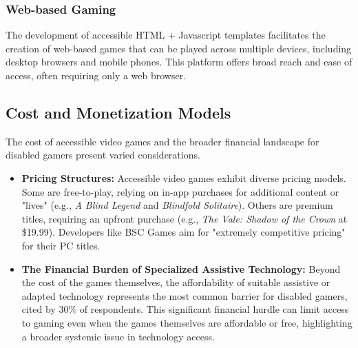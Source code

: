 \subsubsection{Web-based Gaming}

The development of accessible HTML + Javascript templates facilitates the creation of web-based games that can be played across multiple devices, including desktop browsers and mobile phones\supercite{GitHubGameEngines}. This platform offers broad reach and ease of access, often requiring only a web browser.

\subsection{Cost and Monetization Models}

The cost of accessible video games and the broader financial landscape for disabled gamers present varied considerations.
\begin{itemize}
    \item \textbf{Pricing Structures:} Accessible video games exhibit diverse pricing models. Some are free-to-play, relying on in-app purchases for additional content or "lives" (e.g., \textit{A Blind Legend}\supercite{AppleStoreBlindLegend} and \textit{Blindfold Solitaire}\supercite{AppleStoreSolitaire}). Others are premium titles, requiring an upfront purchase (e.g., \textit{The Vale: Shadow of the Crown} at \$19.99\supercite{AFBValeReview}). Developers like BSC Games aim for "extremely competitive pricing" for their PC titles\supercite{DigitalStorm2025}.
    \item \textbf{The Financial Burden of Specialized Assistive Technology:} Beyond the cost of the games themselves, the affordability of suitable assistive or adapted technology represents the most common barrier for disabled gamers, cited by 30\% of respondents\supercite{ScopeGamingReport}. This significant financial hurdle can limit access to gaming even when the games themselves are affordable or free, highlighting a broader systemic issue in technology access.
\end{itemize}

